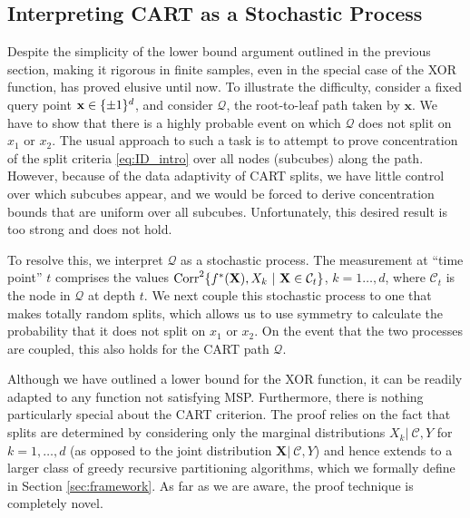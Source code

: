 \documentclass[11pt]{article}
\newcommand{\bx}{\mathbf{x}}
\newcommand{\bX}{\mathbf{X}}
\DeclarePairedDelimiter{\braces}{\lbrace}{\rbrace}
\newcommand{\cell}{\mathcal{C}}
\newcommand{\binspace}{\braces{\pm 1}^\nfeats}
\newcommand{\nfeats}{d}
\renewcommand{\path}{\mathcal{Q}}
\newcommand{\MSP}{\textsf{MSP}}
\newcommand{\Corr}{\operatorname{Corr}}
\begin{document}

\subsection{Interpreting CART as a Stochastic Process}

Despite the simplicity of the lower bound argument outlined in the previous section, making it rigorous in finite samples, even in the special case of the XOR function, has proved elusive until now.
To illustrate the difficulty, consider a fixed query point $\bx \in \binspace$, and consider $\path$, the root-to-leaf path taken by $\bx$.
We have to show that there is a highly probable event on which $\path$ does not split on $x_1$ or $x_2$.
The usual approach to such a task is to attempt to prove concentration of the split criteria \eqref{eq:ID_intro} over all nodes (subcubes) along the path.
However, because of the data adaptivity of CART splits, we have little control over which subcubes appear, and we would be forced to derive concentration bounds that are uniform over all subcubes.
Unfortunately, this desired result is too strong and does not hold.

To resolve this, we interpret $\path$ as a stochastic process.
The measurement at ``time point'' $t$ comprises the values $\Corr^2\braces*{f^*(\bX),X_k~|~\bX \in \cell_t}$, $k=1\ldots,\nfeats$, where $\cell_t$ is the node in $\path$ at depth $t$.
We next couple this stochastic process to one that makes totally random splits, which allows us to use symmetry to calculate the probability that it does not split on $x_1$ or $x_2$.
On the event that the two processes are coupled, this also holds for the CART path $\path$.

Although we have outlined a lower bound for the XOR function, it can be readily adapted to any function not satisfying \MSP.
Furthermore, there is nothing particularly special about the CART criterion.
The proof relies on the fact that splits are determined by considering only the marginal distributions $X_k|~\cell,Y$ for $k=1,\ldots,\nfeats$ (as opposed to the joint distribution $\bX|~\cell,Y$) and hence extends to a larger class of greedy recursive partitioning algorithms, which we formally define in Section \ref{sec:framework}.
As far as we are aware, the proof technique is completely novel.
\end{document}
